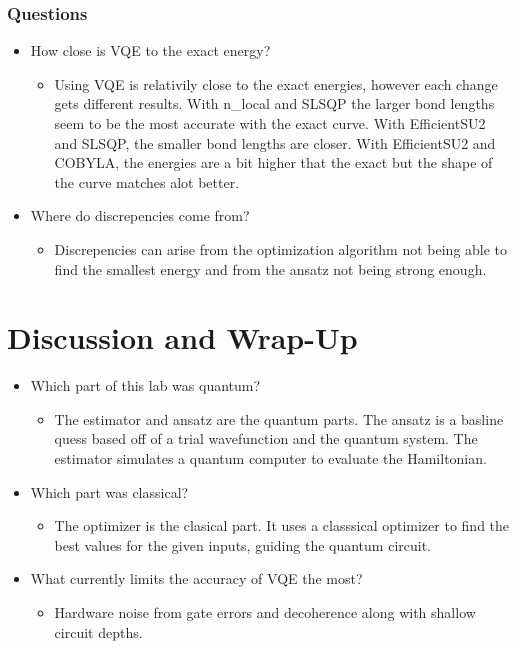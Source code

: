 \documentclass{exam}
\begin{document}
            \subsubsection{Questions}
                \begin{itemize}
                    \item How close is VQE to the exact energy?
                    \begin{itemize}
                        \item Using VQE is relativily close to the exact energies, however each change gets different results. With n\_local and SLSQP the larger bond lengths seem to be the most accurate with the exact curve. With EfficientSU2 and SLSQP, the smaller bond lengths are closer. With EfficientSU2 and COBYLA, the energies are a bit higher that the exact but the shape of the curve matches alot better. 
                    \end{itemize}
                    \item Where do discrepencies come from?
                    \begin{itemize}
                        \item Discrepencies can arise from the optimization algorithm not being able to find the smallest energy and from the ansatz not being strong enough.
                    \end{itemize}
                \end{itemize}
    \section{Discussion and Wrap-Up}
        \begin{itemize}
            \item Which part of this lab was quantum?
            \begin{itemize}
                \item The estimator and ansatz are the quantum parts. The ansatz is a basline quess based off of a trial wavefunction and the quantum system. The estimator simulates a quantum computer to evaluate the Hamiltonian.
            \end{itemize}
            \item Which part was classical?
            \begin{itemize}
                \item The optimizer is the clasical part. It uses a classsical optimizer to find the best values for the given inputs, guiding the quantum circuit.
            \end{itemize}
            \item What currently limits the accuracy of VQE the most?
            \begin{itemize}
                \item Hardware noise from gate errors and decoherence along with shallow circuit depths.
            \end{itemize}
        \end{itemize} 
\end{document}
